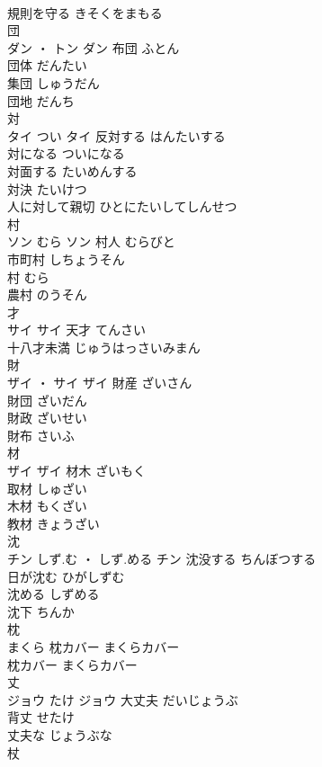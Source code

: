 \documentclass[8pt]{extreport}
\begin{document}
\begin{CJK}{UTF8}{min}
\\	規則を守る	きそくをまもる	
\\	団	
\\	ダン ・ トン		ダン	布団	ふとん	
\\	団体	だんたい	
\\	集団	しゅうだん	
\\	団地	だんち	
\\	対	
\\	タイ	つい	タイ	反対する	はんたいする	
\\	対になる	ついになる	
\\	対面する	たいめんする	
\\	対決	たいけつ	
\\	人に対して親切	ひとにたいしてしんせつ	
\\	村	
\\	ソン	むら	ソン	村人	むらびと	
\\	市町村	しちょうそん	
\\	村	むら	
\\	農村	のうそん	
\\	才	
\\	サイ		サイ	天才	てんさい	
\\	十八才未満	じゅうはっさいみまん	
\\	財	
\\	ザイ ・ サイ		ザイ	財産	ざいさん	
\\	財団	ざいだん	
\\	財政	ざいせい	
\\	財布	さいふ	
\\	材	
\\	ザイ		ザイ	材木	ざいもく	
\\	取材	しゅざい	
\\	木材	もくざい	
\\	教材	きょうざい	
\\	沈	
\\	チン	しず.む ・ しず.める	チン	沈没する	ちんぼつする	
\\	日が沈む	ひがしずむ	
\\	沈める	しずめる	
\\	沈下	ちんか	
\\	枕	
\\	まくら		枕カバー	まくらカバー	
\\	枕カバー	まくらカバー	
\\	丈	
\\	ジョウ	たけ	ジョウ	大丈夫	だいじょうぶ	
\\	背丈	せたけ	
\\	丈夫な	じょうぶな	
\\	杖	

\end{CJK}
\end{document}
